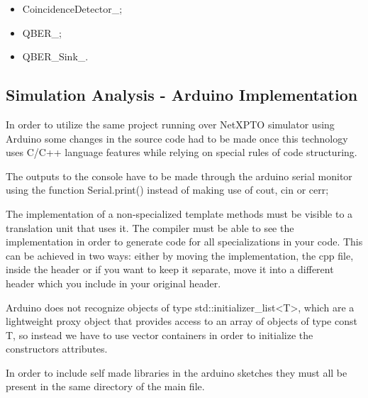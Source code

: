 \begin{refsection}
\begin{itemize}
	\item CoincidenceDetector\_;
	
	\item QBER\_;
	
	\item QBER\_Sink\_.
\end{itemize}





\subsection{Simulation Analysis - Arduino Implementation}

In order to utilize the same project running over NetXPTO simulator using Arduino some changes in the source code had to be made once this technology uses C/C++ language features while relying on special rules of code structuring.

The outputs to the console have to be made through the arduino serial monitor using the function Serial.print() instead of making use of cout, cin or cerr; 

The implementation of a non-specialized template methods must be visible to a translation unit that uses it. The compiler must be able to see the implementation in order to generate code for all specializations in your code. This can be achieved in two ways: either by moving the implementation, the cpp file, inside the header or if you want to keep it separate, move it into a different header which you include in your original header.

Arduino does not recognize objects of type std::initializer\_list<T>, which are a lightweight proxy object that provides access to an array of objects of type const T, so instead we have to use vector containers in order to initialize the constructors attributes.

In order to include self made libraries in the arduino sketches they must all be present in the same directory of the main file.



\end{refsection}
